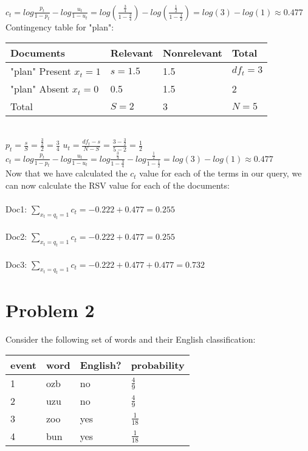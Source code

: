 \documentclass{article}%
\begin{document}
\vspace{2mm}\\
$c_t = log \frac{p_t}{1- p_t} - log \frac{u_t}{1 - u_t}
= log \left(\frac{\frac{3}{4}}{1 - \frac{3}{4}}\right) - log \left(\frac{\frac{1}{2}}{1 - \frac{1}{2}}\right)
= log(3) - log(1) \approx 0.477$
\vspace{5mm}\\
Contingency table for "plan": \\
\begin{tabular}{| l | l | l | l |}
    \hline
    Documents                   &  Relevant     & Nonrelevant   & Total         \\ \hline
    "plan" Present $x_t = 1$    &  $s = 1.5$    & 1.5           & $df_t = 3$    \\ \hline
    "plan" Absent $x_t = 0$     &  0.5          & 1.5           & 2             \\ \hline
    Total                       &  $S = 2$      & 3             & $N = 5$       \\ \hline
\end{tabular}\\
$p_t = \frac{s}{S} = \frac{\frac{3}{2}}{2} = \frac{3}{4}$ \hfill
$u_t = \frac{df_t - s}{N - S} = \frac{3 - \frac{3}{2}}{5 - 2} = \frac{1}{2}$
\vspace{2mm}\\
$c_t = log \frac{p_t}{1- p_t} - log \frac{u_t}{1 - u_t}
= log \frac{\frac{3}{4}}{1- \frac{3}{4}} - log \frac{\frac{1}{2}}{1 - \frac{1}{2}}
= log(3) - log(1) \approx 0.477$
\vspace{5mm}\\
Now that we have calculated the $c_t$ value for each of the terms in our query, we can now calculate the RSV value for each of the documents:\\
\\
Doc1: $\sum_{x_t=q_t=1}c_t = -0.222 + 0.477 = 0.255$\\
\\
Doc2: $\sum_{x_t=q_t=1}c_t = -0.222 + 0.477 = 0.255$\\
\\
Doc3: $\sum_{x_t=q_t=1}c_t = -0.222 + 0.477 + 0.477 = 0.732$\\
\section*{Problem 2}
Consider the following set of words and their English classification:\\
\begin{tabular}{| l | l | l | l |}
    \hline
    event   & word  & English?  & probability \\ \hline
    1       & ozb   & no        & $\frac{4}{9}$ \\ \hline
    2       & uzu   & no        & $\frac{4}{9}$ \\ \hline
    3       & zoo   & yes       & $\frac{1}{18}$ \\ \hline
    4       & bun   & yes       & $\frac{1}{18}$ \\ \hline
\end{tabular}
\end{document}
